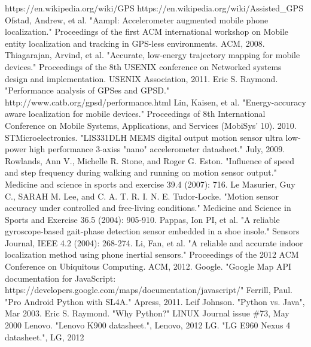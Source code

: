 \documentclass[journal]{IEEEtran}
\begin{document}
\ifCLASSOPTIONcaptionsoff
  \newpage
\fi

\begin{thebibliography}{1}

	https://en.wikipedia.org/wiki/GPS
	https://en.wikipedia.org/wiki/Assisted\_GPS
	Ofstad, Andrew, et al. "Aampl: Accelerometer augmented mobile phone localization." Proceedings of the first ACM international workshop on Mobile entity localization and tracking in GPS-less environments. ACM, 2008.
	Thiagarajan, Arvind, et al. "Accurate, low-energy trajectory mapping for mobile devices." Proceedings of the 8th USENIX conference on Networked systems design and implementation. USENIX Association, 2011.
	Eric S. Raymond. "Performance analysis of GPSes and GPSD." http://www.catb.org/gpsd/performance.html
	Lin, Kaisen, et al. "Energy-accuracy aware localization for mobile devices." Proceedings of 8th International Conference on Mobile Systems, Applications, and Services (MobiSys’ 10). 2010.
	STMicroelectronics. "LIS331DLH MEMS digital output motion sensor ultra low-power high performance 3-axiss "nano" accelerometer datasheet." July, 2009.
	Rowlands, Ann V., Michelle R. Stone, and Roger G. Eston. "Influence of speed and step frequency during walking and running on motion sensor output." Medicine and science in sports and exercise 39.4 (2007): 716.
	Le Masurier, Guy C., SARAH M. Lee, and C. A. T. R. I. N. E. Tudor-Locke. "Motion sensor accuracy under controlled and free-living conditions." Medicine and Science in Sports and Exercise 36.5 (2004): 905-910.
	Pappas, Ion PI, et al. "A reliable gyroscope-based gait-phase detection sensor embedded in a shoe insole." Sensors Journal, IEEE 4.2 (2004): 268-274.
	Li, Fan, et al. "A reliable and accurate indoor localization method using phone inertial sensors." Proceedings of the 2012 ACM Conference on Ubiquitous Computing. ACM, 2012.
	Google. "Google Map API documentation for JavaScript: https://developers.google.com/maps/documentation/javascript/" 
	Ferrill, Paul. "Pro Android Python with SL4A." Apress, 2011.
	Leif Johnson. "Python vs. Java", Mar 2003.
	Eric S. Raymond. "Why Python?" LINUX Journal issue \#73, May 2000
	Lenovo. "Lenovo K900 datasheet.", Lenovo, 2012
	LG. "LG E960 Nexus 4 datasheet.", LG, 2012


\end{thebibliography}


\end{document}

